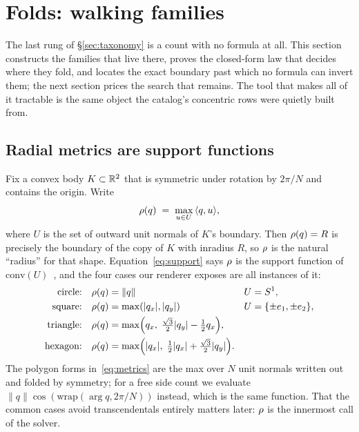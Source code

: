 \section{Folds: walking families}
\label{sec:walking}

The last rung of \S\ref{sec:taxonomy} is a count with no formula at all. This
section constructs the families that live there, proves the closed-form law
that decides where they fold, and locates the exact boundary past which no
formula can invert them; the next section prices the search that remains. The
tool that makes all of it tractable is the same object the catalog's
concentric rows were quietly built from.

\subsection{Radial metrics are support functions}

Fix a convex body $K\subset\mathbb{R}^2$ that is symmetric under rotation by $2\pi/N$ and
contains the origin. Write
\begin{equation}
  \rho(q) \;=\; \max_{u \in U}\, \langle q, u\rangle,
  \label{eq:support}
\end{equation}
where $U$ is the set of outward unit normals of $K$'s boundary. Then
$\rho(q)=R$ is precisely the boundary of the copy of $K$ with inradius $R$, so
$\rho$ is the natural ``radius'' for that shape. Equation~\eqref{eq:support} says
$\rho$ is the support function of $\mathrm{conv}(U)$~\cite{Rockafellar1970Convex}, and
the four cases our renderer exposes are all instances of it:
\begin{align}
  \text{circle:}\quad   &\rho(q) = \lVert q\rVert          &  U &= S^1, \notag\\
  \text{square:}\quad   &\rho(q) = \max(|q_x|, |q_y|)      &  U &= \{\pm e_1, \pm e_2\}, \notag\\
  \text{triangle:}\quad &\rho(q) = \max\Bigl(q_x,\; \tfrac{\sqrt3}{2}|q_y| - \tfrac{1}{2}q_x\Bigr), \notag\\
  \text{hexagon:}\quad  &\rho(q) = \max\Bigl(|q_x|,\; \tfrac{1}{2}|q_x| + \tfrac{\sqrt3}{2}|q_y|\Bigr).
  \label{eq:metrics}
\end{align}
The polygon forms in~\eqref{eq:metrics} are the max over $N$ unit normals written
out and folded by symmetry; for a free side count we evaluate
$\lVert q\rVert\cos(\mathrm{wrap}(\arg q, 2\pi/N))$ instead, which is the same
function. That the common cases avoid transcendentals entirely matters later:
$\rho$ is the innermost call of the solver.

